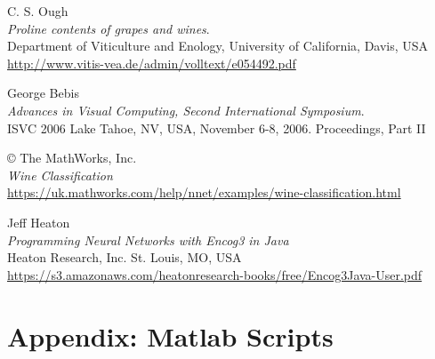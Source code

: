 \documentclass[10pt,twocolumn,letterpaper]{article}
\begin{document}
\begin{thebibliography}{9}
C. S. Ough\\
\textit{Proline contents of grapes and wines}. \\
Department of Viticulture and Enology, University of California, Davis, USA\\
\url{http://www.vitis-vea.de/admin/volltext/e054492.pdf}

George Bebis\\
\textit{Advances in Visual Computing, Second International Symposium}.\\
ISVC 2006 Lake Tahoe, NV, USA, November 6-8, 2006. Proceedings, Part II 

© The MathWorks, Inc.\\
\textit{Wine Classification}\\
\url{https://uk.mathworks.com/help/nnet/examples/wine-classification.html}

Jeff Heaton\\
\textit{Programming Neural Networks with Encog3 in Java}\\
Heaton Research, Inc. St. Louis, MO, USA\\
\url{https://s3.amazonaws.com/heatonresearch-books/free/Encog3Java-User.pdf}

\end{thebibliography}

\section{Appendix: Matlab Scripts}
\end{document}
